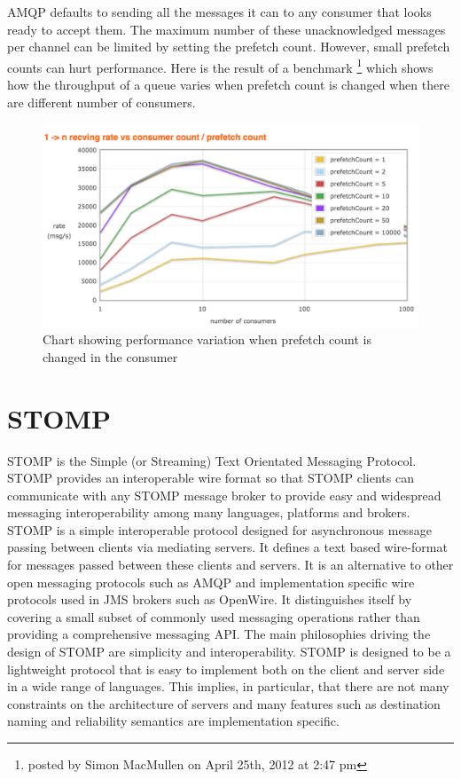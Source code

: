 AMQP defaults to sending all the messages it can to any consumer that looks ready to accept them. The maximum number of these unacknowledged messages per channel can be limited by setting the prefetch count. However, small prefetch counts can hurt performance. Here is the result of a benchmark \footnote{posted by Simon MacMullen on April 25th, 2012 at 2:47 pm} which shows how the throughput of a queue varies when prefetch count is changed when there are different number of consumers.
\begin{figure}[H]
  \centering
  \includegraphics[width=1\textwidth]{figures/rabbitmqPrefetch}
  \caption[Chart showing performance variation when prefetch count is changed in the consumer]{Chart showing performance variation when prefetch count is changed in the consumer\footnotemark}
\end{figure}

\section{STOMP}
\label{sec:stomp}
STOMP is the Simple (or Streaming) Text Orientated Messaging Protocol.
STOMP provides an interoperable wire format so that STOMP clients can communicate with any STOMP message broker to provide easy and widespread messaging interoperability among many languages, platforms and brokers. ~\parencite{stomp}
STOMP is a simple interoperable protocol designed for asynchronous message passing between clients via mediating servers. It defines a text based wire-format for messages passed between these clients and servers.
It is an alternative to other open messaging protocols such as AMQP and implementation specific wire protocols used in JMS brokers such as OpenWire. It distinguishes itself by covering a small subset of commonly used messaging operations rather than providing a comprehensive messaging API.
The main philosophies driving the design of STOMP are simplicity and interoperability.
STOMP is designed to be a lightweight protocol that is easy to implement both on the client and server side in a wide range of languages. This implies, in particular, that there are not many constraints on the architecture of servers and many features such as destination naming and reliability semantics are implementation specific.
